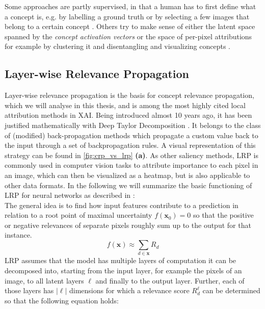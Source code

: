 Some approaches are partly supervised, in that a human has to first define what a concept is, e.g. by labelling a ground truth or by selecting a few images that belong to a certain concept \cite{Kim2018, Singla2022}. Others try to make sense of either the latent space spanned by the \textit{concept activation vectors} or the space of per-pixel attributions for example by clustering it \cite{Lapuschkin2019,Vielhaben2023} and disentangling and visualizing concepts  \cite{Ghorbani2019,Zhang2021,Leemann2023,Fel2023,Chormai2022, Singla2022}.

\subsection{Layer-wise Relevance Propagation}\label{section:lrp}
Layer-wise relevance propagation \cite{Bach2015} is the basis for concept relevance propagation, which we will analyse in this thesis, and is among the most highly cited local attribution methods in XAI. Being introduced almost 10 years ago, it has been justified mathematically with Deep Taylor Decomposition \cite{Montavon2017}. It belongs to the class of (modified) back-propagation methods which propagate a custom value back to the input through a set of backpropagation rules. A visual representation of this strategy can be found in \cref{fig:crp_vs_lrp} \textbf{(a)}. As other saliency methods, LRP is commonly used in computer vision tasks to attribute importance to each pixel in an image, which can then be visualized as a heatmap, but is also applicable to other data formats. In the following we will summarize the basic functioning of LRP for neural networks as described in \cite{Bach2015}:\\
The general idea is to find how input features contribute to a prediction in relation to a root point of maximal uncertainty $f(\mathbf{x}_0) = 0$ so that the positive or negative relevances of separate pixels roughly sum up to the output for that instance.
\begin{equation}\displaystyle
    f(\mathbf{x}) \approx \sum_{d \in \mathbf{x}} R_d
\end{equation}
LRP assumes that the model has multiple layers of computation it can be decomposed into, starting from the input layer, for example the pixels of an image, to all latent layers $\ell$ and finally to the output layer. Further, each of those layers has $|\ell|$ dimensions for which a relevance score $R^{\ell}_d$ can be determined so that the following equation holds:


